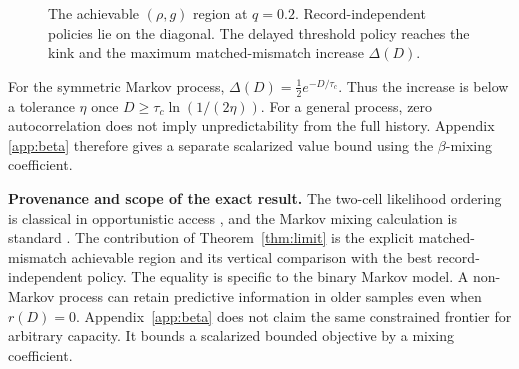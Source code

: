 \begin{figure}[t]
\centering
{}
\caption{The achievable $(\rho,g)$ region at $q=0.2$. Record-independent
policies lie on the diagonal. The delayed threshold policy reaches the kink and
the maximum matched-mismatch increase $\Delta(D)$.}
\label{fig:theory}
\end{figure}

\begin{corollary}\label{cor:imp}
For the symmetric Markov process,
$\Delta(D)=\tfrac12 e^{-D/\tau_c}$. Thus the increase is below a tolerance
$\eta$ once $D\ge\tau_c\ln(1/(2\eta))$. For a general process, zero
autocorrelation does not imply unpredictability from the full history. Appendix
\ref{app:beta} therefore gives a separate scalarized value bound using the
$\beta$-mixing coefficient.
\end{corollary}

\noindent\textbf{Provenance and scope of the exact result.}
The two-cell likelihood ordering is classical in opportunistic access
\cite{myopicaccess}, and the Markov mixing calculation is standard
\cite{lpw}. The contribution of Theorem~\ref{thm:limit} is the explicit
matched-mismatch achievable region and its vertical comparison with the best
record-independent policy. The equality is specific to the binary Markov model.
A non-Markov process can retain predictive information in older samples even
when $r(D)=0$. Appendix~\ref{app:beta} does not claim the same constrained
frontier for arbitrary capacity. It bounds a scalarized bounded objective by a
mixing coefficient.

